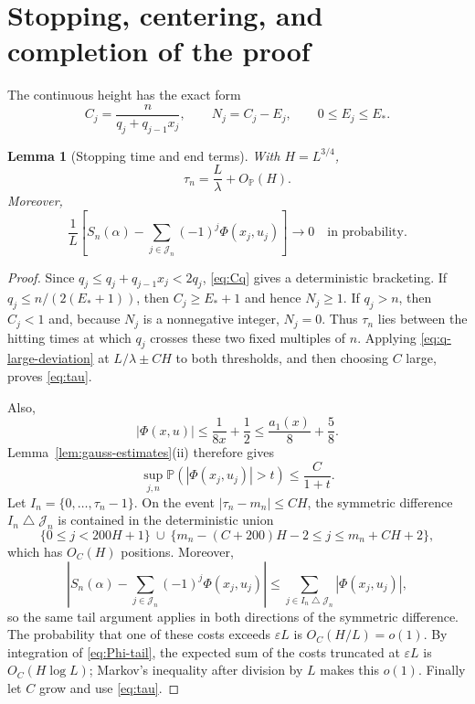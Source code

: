 \documentclass[11pt,a4paper]{amsart}
\newtheorem{lemma}[theorem]{Lemma}
\theoremstyle{definition}
\theoremstyle{remark}
\newcommand{\Pp}{\mathbb P}
\begin{document}
\section{Stopping, centering, and completion of the proof}

The continuous height has the exact form
\begin{equation}\label{eq:Cq}
 C_j=\frac{n}{q_j+q_{j-1}x_j},
 \qquad N_j=C_j-E_j,\qquad 0\le E_j\le E_*.
\end{equation}

\begin{lemma}[Stopping time and end terms]\label{lem:stopping}
With $H=L^{3/4}$,
\begin{equation}\label{eq:tau}
 \tau_n=\frac L\lambda+O_{\Pp}(H).
\end{equation}
Moreover,
\begin{equation}\label{eq:end-terms}
 \frac1L\left[
 S_n(\alpha)-\sum_{j\in\mathcal J_n}(-1)^j\Phi(x_j,u_j)
 \right]\longrightarrow0
 \quad\text{in probability}.
\end{equation}
\end{lemma}

\begin{proof}
Since $q_j\le q_j+q_{j-1}x_j<2q_j$, \eqref{eq:Cq} gives a deterministic
bracketing.  If $q_j\le n/(2(E_*+1))$, then $C_j\ge E_*+1$ and hence
$N_j\ge1$.  If $q_j>n$, then $C_j<1$ and, because $N_j$ is a nonnegative
integer, $N_j=0$.  Thus $\tau_n$ lies between the hitting times at which
$q_j$ crosses these two fixed multiples of $n$.  Applying
\eqref{eq:q-large-deviation} at $L/\lambda\pm CH$ to both thresholds, and
then choosing $C$ large, proves \eqref{eq:tau}.

Also,
\begin{equation}\label{eq:Phi-tail-bound}
 |\Phi(x,u)|\le\frac1{8x}+\frac12
 \le\frac{a_1(x)}8+\frac58.
\end{equation}
Lemma~\ref{lem:gauss-estimates}(ii) therefore gives
\begin{equation}\label{eq:Phi-tail}
 \sup_{j,n}\Pp(|\Phi(x_j,u_j)|>t)\le\frac{C}{1+t}.
\end{equation}
Let $I_n=\{0,\ldots,\tau_n-1\}$.  On the event
$|\tau_n-m_n|\le CH$, the symmetric difference
$I_n\mathbin{\triangle}\mathcal J_n$ is contained in the deterministic union
\[
 \{0\le j<200H+1\}
 \ \cup\ 
 \{m_n-(C+200)H-2\le j\le m_n+CH+2\},
\]
which has $O_C(H)$ positions.  Moreover,
\[
 \left|S_n(\alpha)-\sum_{j\in\mathcal J_n}(-1)^j\Phi(x_j,u_j)\right|
 \le\sum_{j\in I_n\mathbin{\triangle}\mathcal J_n}|\Phi(x_j,u_j)|,
\]
so the same tail argument applies in both directions of the symmetric
difference.  The probability that one of these costs exceeds
$\varepsilon L$ is $O_C(H/L)=o(1)$.  By integration of
\eqref{eq:Phi-tail}, the expected sum of the costs truncated at
$\varepsilon L$ is $O_C(H\log L)$; Markov's inequality after division by
$L$ makes this $o(1)$.  Finally let $C$ grow and use \eqref{eq:tau}.
\end{proof}
\end{document}
